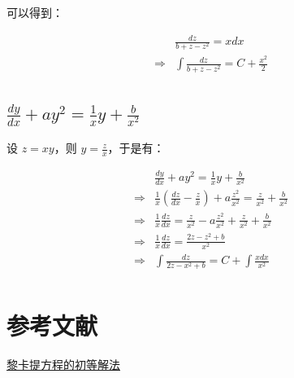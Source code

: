 \documentclass[UTF8]{article}
\begin{document}
可以得到：

$$
\begin{aligned}
& \frac{dz}{b + z - z^2} = x dx \\
\Rightarrow & \int \frac{dz}{b + z - z^2} = C + \frac{x^2}{2} \\
\end{aligned}
$$

\subsection{$\frac{dy}{dx} + ay^2 = \frac{1}{x}y + \frac{b}{x^2}$}

设 $z=xy$，则 $y=\frac{z}{x}$，于是有：

$$
\begin{aligned}
& \frac{dy}{dx} + ay^2 = \frac{1}{x}y + \frac{b}{x^2} \\
\Rightarrow
& \frac{1}{x} \left(\frac{dz}{dx} - \frac{z}{x}\right) + a\frac{z^2}{x^2} = \frac{z}{x^2} + \frac{b}{x^2} \\
\Rightarrow
& \frac{1}{x} \frac{dz}{dx} = \frac{z}{x^2} - a\frac{z^2}{x^2} + \frac{z}{x^2} + \frac{b}{x^2} \\
\Rightarrow
& \frac{1}{x} \frac{dz}{dx} = \frac{2z - z^2 + b}{x^2} \\
\Rightarrow
& \int \frac{dz}{2z - x^2 + b} = C + \int \frac{xdx}{x^2} \\
\end{aligned}
$$

\section{参考文献}

\href{https://wenku.baidu.com/view/4b24054a16fc700abb68fc62.html}{黎卡提方程的初等解法}
\end{document}
